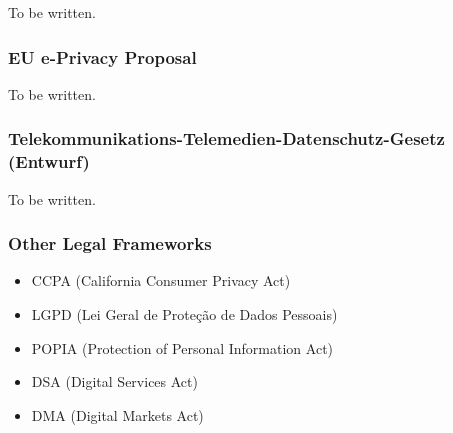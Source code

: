 To be written.

\subsubsection{EU e-Privacy Proposal}

To be written.

\subsubsection{Telekommunikations-Telemedien-Datenschutz-Gesetz (Entwurf)}

To be written.

\subsubsection{Other Legal Frameworks}

\begin{itemize}
 \item CCPA (California Consumer Privacy Act)
 \item LGPD (Lei Geral de Proteção de Dados Pessoais)
 \item POPIA (Protection of Personal Information Act)
 \item DSA (Digital Services Act)
 \item DMA (Digital Markets Act)
\end{itemize}


